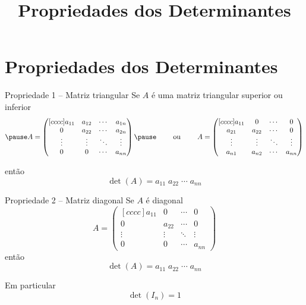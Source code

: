 \documentclass[fleqn,aspectratio=169,12pt]{beamer}
\title{Propriedades dos Determinantes}
\begin{document}
\addtitle

\section{Propriedades dos Determinantes}

\begin{frame}{Propriedade 1 -- Matriz triangular}
Se $A$ é uma matriz triangular superior ou inferior
\[
  \pause
  A =
  \begin{pmatrix}[cccc]
    a_{11} & a_{12} & \cdots & a_{1n} \\
    0      & a_{22} & \cdots & a_{2n} \\
    \vdots & \vdots & \ddots & \vdots \\
    0      & 0      & \cdots & a_{nn}
  \end{pmatrix}
  \pause
  \qquad\text{ ou }\qquad
  A =
  \begin{pmatrix}[cccc]
    a_{11} & 0      & \cdots & 0      \\
    a_{21} & a_{22} & \cdots & 0      \\
    \vdots & \vdots & \ddots & \vdots \\
    a_{n1} & a_{n2} & \cdots & a_{nn}
  \end{pmatrix}
\]

\pause
então
\[
  \det(A) = a_{11}\; a_{22}\; \cdots\; a_{nn}
\]
\end{frame}



\begin{frame}{Propriedade 2 -- Matriz diagonal}
  Se $A$ é diagonal
  \[
    A =
    \begin{pmatrix}[cccc]
      a_{11} & 0      & \cdots & 0      \\
      0      & a_{22} & \cdots & 0      \\
      \vdots & \vdots & \ddots & \vdots \\
      0      & 0      & \cdots & a_{nn}
    \end{pmatrix}
  \]
  \pause
  então
  \[
    \det(A) = a_{11} \; a_{22} \; \cdots \; a_{nn}
  \]

  \pause
  Em particular
  \[
    \det(I_n) = 1
  \]
\end{frame}
\end{document}
